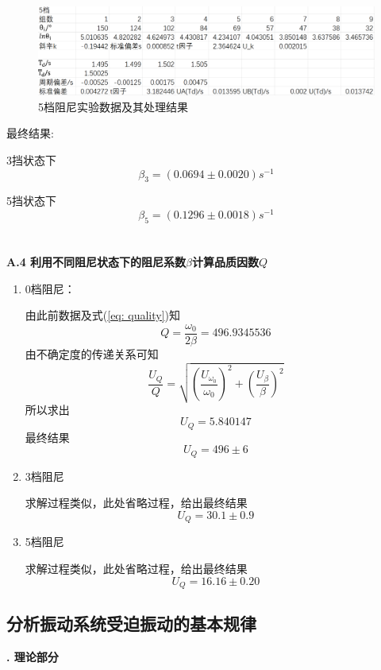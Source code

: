 \documentclass[a4paper,11pt]{article}
\begin{document}
        \begin{figure}[ht]
            \centering
            \includegraphics[scale=0.5]{5档阻尼 数据.png}
            \caption{5档阻尼实验数据及其处理结果}
        \end{figure}

        最终结果:

        3挡状态下
        $$
            \beta_3 = (0.0694 \pm 0.0020)s^{-1}
        $$

        5挡状态下
        $$
            \beta_5 = (0.1296 \pm 0.0018)s^{-1}
        $$
        \\ \\
        \textbf{A.4 利用不同阻尼状态下的阻尼系数$\beta$计算品质因数$Q$}
        \begin{enumerate}
            \item 0档阻尼：

            由此前数据及式(\ref{eq: quality})知
            $$
                Q = \frac{\omega_0}{2\beta} = 496.9345536
            $$
            由不确定度的传递关系可知
            $$
                \frac{U_Q}Q = \sqrt{(\frac{U_{\omega_0}}{\omega_0})^2 + (\frac{U_\beta}\beta)^2}
            $$
            所以求出
            $$
                U_Q = 5.840147
            $$
            最终结果
            $$
                U_Q = 496 \pm 6
            $$
            \item 3档阻尼
            
            求解过程类似，此处省略过程，给出最终结果
            $$
                U_Q = 30.1 \pm 0.9
            $$
            \item 5档阻尼
            
            求解过程类似，此处省略过程，给出最终结果
            $$
                U_Q = 16.16 \pm 0.20
            $$
        \end{enumerate}
        
    \subsection{分析振动系统受迫振动的基本规律}
    \textbf{. 理论部分}
\end{document}
